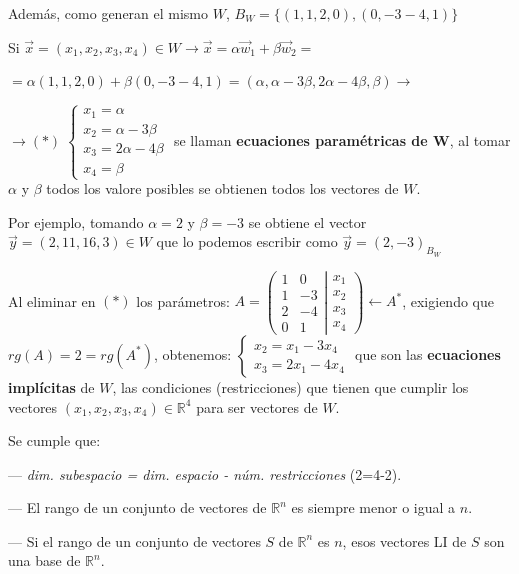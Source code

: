 \noindent Además, como generan el mismo $W$, $B_W=\{(1,1,2,0), (0,-3-4,1) \}$

\noindent Si $\vec x=(x_1,x_2,x_3,x_4) \in W \to \vec x=\alpha \vec w_1 + \beta \vec w_2 = $

\noindent $=\alpha (1,1,2,0) + \beta (0,-3-4,1)=(\alpha , \alpha-3\beta, 2\alpha-4\beta, \beta) \to $

\noindent \small{$\to (*)\; \begin{cases} x_1=\alpha \\ x_2= \alpha-3\beta \\ x_3= 2\alpha-4\beta \\ x_4= \beta  \end{cases}$} \normalsize{se} llaman \textbf{ecuaciones paramétricas de W}, 
al tomar $\alpha$ y $\beta$ todos los valore posibles se obtienen todos los vectores de $W$.

\noindent Por ejemplo, tomando $\alpha=2$ y $\beta=-3$ se obtiene el vector $\vec y=(2,11,16,3) \in W$ que lo  podemos escribir como $\vec y=(2,-3)_{B_W}$

\noindent Al eliminar en $(*)$ los parámetros: $A=\left( \begin{matrix} \boxed{1}&\boxed{0}\\1&-3\\2&-4\\\boxed{0}&\boxed{1} \end{matrix} \right| \left. \begin{matrix} x_1\\x_2\\x_3\\x_4 \end{matrix} \right) \leftarrow A^*$, exigiendo que $rg(A)=2=rg(A^*)$, obtenemos: $\begin{cases} x_2=x_1-3x_4\\x_3=2x_1-4x_4 \end{cases}$ que son las \textbf{ecuaciones implícitas} de $W$, las condiciones (restricciones) que tienen que cumplir los vectores $(x_1,x_2,x_3,x_4) \in \mathbb R^4$ para ser vectores de $W$.



\noindent Se cumple que:

--- \emph{dim. subespacio = dim. espacio - núm. restricciones} \tiny{(2=4-2)}\normalsize{.}

--- El rango de un conjunto de vectores de $\mathbb R^n$ es siempre menor o igual a $n$.

--- Si el rango de un conjunto de vectores $S$ de $\mathbb R^n$ es $n$, esos vectores LI de $S$ son una base de $\mathbb R^n$.

